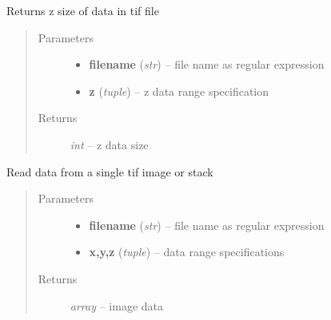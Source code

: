 \documentclass[letterpaper,10pt,english]{sphinxmanual}
\begin{document}

\begin{fulllineitems}
\label{api/ClearMap.IO:ClearMap.IO.TIF.dataZSize}
Returns z size of data in tif file
\begin{quote}\begin{description}
\item[{Parameters}] \leavevmode\begin{itemize}
\item {} 
\textbf{filename} (\emph{str}) --
file name as regular expression

\item {} 
\textbf{z} (\emph{tuple}) --
z data range specification

\end{itemize}

\item[{Returns}] \leavevmode
\emph{int} --
z data size

\end{description}\end{quote}

\end{fulllineitems}


\begin{fulllineitems}
\label{api/ClearMap.IO:ClearMap.IO.TIF.readData}
Read data from a single tif image or stack
\begin{quote}\begin{description}
\item[{Parameters}] \leavevmode\begin{itemize}
\item {} 
\textbf{filename} (\emph{str}) --
file name as regular expression

\item {} 
\textbf{x,y,z} (\emph{tuple}) --
data range specifications

\end{itemize}

\item[{Returns}] \leavevmode
\emph{array} --
image data

\end{description}\end{quote}

\end{fulllineitems}
\end{document}
